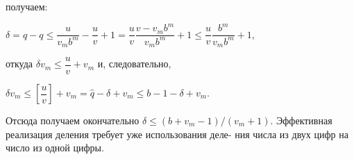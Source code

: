 \documentclass{/home/pkmixer/mai_practice/git_rep/mai_prac_2017/template/mai_book}
\begin{document}
\noindent
получаем:
\begin{center}
$\delta=\hat{q}-q\leqslant\dfrac{u}{v_mb^m}-\dfrac{u}{v}+1=\dfrac{u}{v}\dfrac{v-v_mb^m}{v_mb^m}+1\leqslant\dfrac{u}{v}\dfrac{b^m}{v_mb^m}+1$,
\end{center}
откуда $\delta{v_m\leqslant{\dfrac{u}{v}}+v_m}$ и, следовательно,
\begin{center}
$\delta{v_m}\leqslant\left[\dfrac{u}{v}\right]+v_m=\hat{q}-\delta+v_m\leqslant{b-1-\delta+v_m}$.
\end{center}
Отсюда получаем окончательно $\delta\leqslant(b+v_m-1)/(v_m+1)$.\newline
\hspace*{15pt}Эффективная реализация деления требует уже использования деле-\linebreak
ния числа из двух цифр на число из одной цифры.\\
\end{document}
